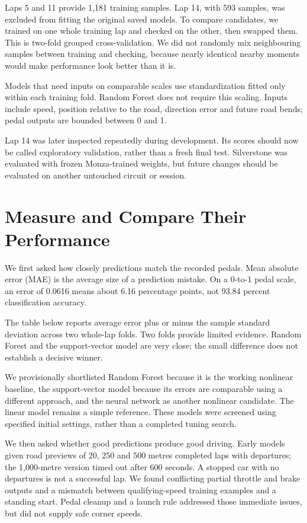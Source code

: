 \documentclass[11pt,a4paper]{article}
\begin{document}
Laps 5 and 11 provide 1,181 training samples. Lap 14, with 593 samples, was excluded from fitting the original saved models. To compare candidates, we trained on one whole training lap and checked on the other, then swapped them. This is two-fold grouped cross-validation. We did not randomly mix neighbouring samples between training and checking, because nearly identical nearby moments would make performance look better than it is.

Models that need inputs on comparable scales use standardization fitted only within each training fold. Random Forest does not require this scaling. Inputs include speed, position relative to the road, direction error and future road bends; pedal outputs are bounded between 0 and 1.

Lap 14 was later inspected repeatedly during development. Its scores should now be called exploratory validation, rather than a fresh final test. Silverstone was evaluated with frozen Monza-trained weights, but future changes should be evaluated on another untouched circuit or session.
\section{Measure and Compare Their Performance}
We first asked how closely predictions match the recorded pedals. Mean absolute error (MAE) is the average size of a prediction mistake. On a 0-to-1 pedal scale, an error of 0.0616 means about 6.16 percentage points, not 93.84 percent classification accuracy.

The table below reports average error plus or minus the sample standard deviation across two whole-lap folds. Two folds provide limited evidence. Random Forest and the support-vector model are very close; the small difference does not establish a decisive winner.

We provisionally shortlisted Random Forest because it is the working nonlinear baseline, the support-vector model because its errors are comparable using a different approach, and the neural network as another nonlinear candidate. The linear model remains a simple reference. These models were screened using specified initial settings, rather than a completed tuning search.

We then asked whether good predictions produce good driving. Early models given road previews of 20, 250 and 500 metres completed laps with departures; the 1,000-metre version timed out after 600 seconds. A stopped car with no departures is not a successful lap. We found conflicting partial throttle and brake outputs and a mismatch between qualifying-speed training examples and a standing start. Pedal cleanup and a launch rule addressed those immediate issues, but did not supply safe corner speeds.
\end{document}
